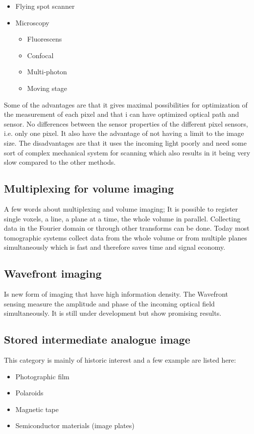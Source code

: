 \begin{itemize}
	\item Flying spot scanner
	\item Microscopy
	\begin{itemize}
		\item Fluorescens
		\item Confocal
		\item Multi-photon
		\item Moving stage
	\end{itemize}
\end{itemize}

Some of the advantages are that it gives maximal possibilities for optimization of the measurement of each pixel and that i can have optimized optical path and sensor. No differences between the sensor properties of the different pixel sensors, i.e. only one pixel. It also have the advantage of not having a limit to the image size. The disadvantages are that it uses the incoming light poorly and need some sort of complex mechanical system for scanning which also results in it being very slow compared to the other methods. 

\subsection*{Multiplexing for volume imaging}
A few words about multiplexing and volume imaging; It is possible to register single voxels, a line, a plane at a time, the whole volume in parallel. Collecting data in the Fourier domain or through other transforms can be done. Today most tomographic systems collect data from the whole volume or from multiple planes simultaneously which is fast and therefore saves time and signal economy. 

\subsection*{Wavefront imaging}
Is new form of imaging that have high information density. The Wavefront sensing measure the amplitude and phase of the incoming optical field simultaneously. It is still under development but show promising results. 

\subsection*{Stored intermediate analogue image}
This category is mainly of historic interest and a few example are listed here:

\begin{itemize}
	\item Photographic film
	\item Polaroids
	\item Magnetic tape 
	\item Semiconductor materials (image plates)
\end{itemize}




